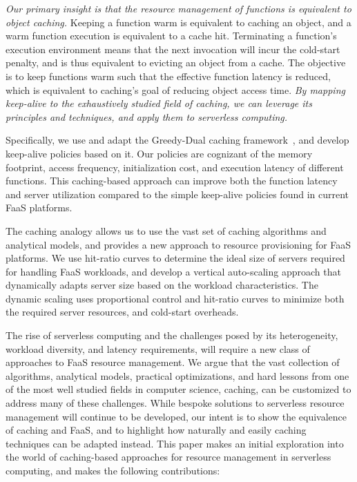 \emph{Our primary insight is that the resource management of functions is equivalent to object caching.}
Keeping a function warm is equivalent to caching an object, and a warm function execution is equivalent to a cache hit. 
Terminating a function's execution environment means that the next invocation will incur the cold-start penalty, and is thus equivalent to evicting an object from a cache. 
The objective is to keep functions warm such that the effective function latency is reduced, which is equivalent to caching's goal of reducing object access time.  
\emph{By mapping keep-alive to the exhaustively studied field of caching, we can leverage its  principles and techniques, and apply them to serverless computing.} 


Specifically, we use and adapt the Greedy-Dual caching framework~\cite{gdsf}, and develop keep-alive policies based on it. 
Our policies are cognizant of the memory footprint, access frequency,  initialization cost, and execution latency of different functions. 
This caching-based approach can improve both the function latency and server utilization compared to the simple keep-alive policies found in current FaaS platforms. 


The caching analogy allows us to use the vast set of caching algorithms and  analytical models, and provides a new approach to resource provisioning for FaaS platforms.
We use hit-ratio curves to determine the ideal size of servers required for handling FaaS workloads, and develop a vertical auto-scaling approach that dynamically adapts server size based on the workload characteristics.
The dynamic scaling uses proportional control and hit-ratio curves to minimize both the required server resources, and cold-start overheads. 

The rise of serverless computing and the challenges posed by its heterogeneity, workload diversity, and latency requirements, will require a new class of approaches to FaaS resource management. 
We argue that the vast collection of algorithms, analytical models, practical optimizations, and hard lessons from one of the most well studied fields in computer science, caching, can be customized to address many of these challenges. 
While bespoke solutions to serverless resource management will continue to be developed, our intent is to show the equivalence of caching and FaaS, and to highlight how naturally and easily caching techniques can be adapted instead. 
This paper makes an initial exploration into the world of caching-based approaches for resource management in serverless computing, and makes the following contributions:

